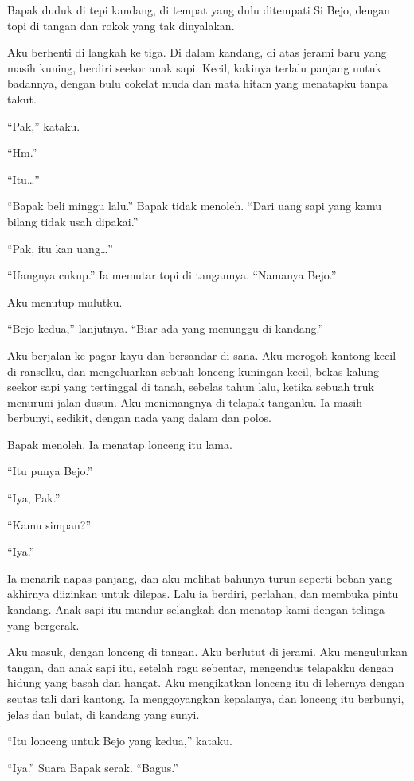 \documentclass[11pt,twoside,openany]{book}
\makeatletter
\newcommand{\scenebreak}{\par\vspace{0.9em}{\centering\textsc{*\hspace{0.7em}*\hspace{0.7em}*}\par}\vspace{0.9em}\@afterindentfalse\@afterheading}
\makeatother
\begin{document}
\scenebreak
Bapak duduk di tepi kandang, di tempat yang dulu ditempati Si Bejo, dengan topi di tangan dan rokok yang tak dinyalakan.

Aku berhenti di langkah ke tiga. Di dalam kandang, di atas jerami baru yang masih kuning, berdiri seekor anak sapi. Kecil, kakinya terlalu panjang untuk badannya, dengan bulu cokelat muda dan mata hitam yang menatapku tanpa takut.

``Pak,'' kataku.

``Hm.''

``Itu\ldots{}''

``Bapak beli minggu lalu.'' Bapak tidak menoleh. ``Dari uang sapi yang kamu bilang tidak usah dipakai.''

``Pak, itu kan uang\ldots{}''

``Uangnya cukup.'' Ia memutar topi di tangannya. ``Namanya Bejo.''

Aku menutup mulutku.

``Bejo kedua,'' lanjutnya. ``Biar ada yang menunggu di kandang.''

Aku berjalan ke pagar kayu dan bersandar di sana. Aku merogoh kantong kecil di ranselku, dan mengeluarkan sebuah lonceng kuningan kecil, bekas kalung seekor sapi yang tertinggal di tanah, sebelas tahun lalu, ketika sebuah truk menuruni jalan dusun. Aku menimangnya di telapak tanganku. Ia masih berbunyi, sedikit, dengan nada yang dalam dan polos.

Bapak menoleh. Ia menatap lonceng itu lama.

``Itu punya Bejo.''

``Iya, Pak.''

``Kamu simpan?''

``Iya.''

Ia menarik napas panjang, dan aku melihat bahunya turun seperti beban yang akhirnya diizinkan untuk dilepas. Lalu ia berdiri, perlahan, dan membuka pintu kandang. Anak sapi itu mundur selangkah dan menatap kami dengan telinga yang bergerak.

Aku masuk, dengan lonceng di tangan. Aku berlutut di jerami. Aku mengulurkan tangan, dan anak sapi itu, setelah ragu sebentar, mengendus telapakku dengan hidung yang basah dan hangat. Aku mengikatkan lonceng itu di lehernya dengan seutas tali dari kantong. Ia menggoyangkan kepalanya, dan lonceng itu berbunyi, jelas dan bulat, di kandang yang sunyi.

``Itu lonceng untuk Bejo yang kedua,'' kataku.

``Iya.'' Suara Bapak serak. ``Bagus.''
\end{document}
